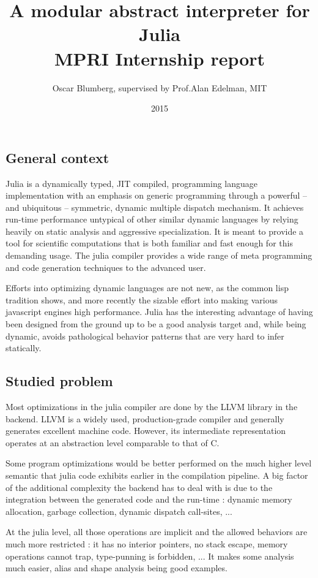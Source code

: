 \documentclass[11pt]{article}
\title{\vspace{-5ex}A modular abstract interpreter for Julia \\ MPRI Internship report}
\author{Oscar Blumberg, supervised by Prof.\@ Alan Edelman, MIT}
\date{2015}
\begin{document}
\onehalfspacing
\maketitle
\thispagestyle{empty}
\vspace{2ex}
\subsection*{General context}

Julia is a dynamically typed, JIT compiled, programming language implementation with an emphasis on generic programming through a powerful -- and ubiquitous -- symmetric, dynamic multiple dispatch mechanism. It achieves run-time performance untypical of other similar dynamic languages by relying heavily on static analysis and aggressive specialization. It is meant to provide a tool for scientific computations that is both familiar and fast enough for this demanding usage. The julia compiler provides a wide range of meta programming and code generation techniques to the advanced user.

Efforts into optimizing dynamic languages are not new, as the common lisp tradition shows, and more recently the sizable effort into making various javascript engines high performance. Julia has the interesting advantage of having been designed from the ground up to be a good analysis target and, while being dynamic, avoids pathological behavior patterns that are very hard to infer statically.

\subsection*{Studied problem}

Most optimizations in the julia compiler are done by the LLVM library in the backend. LLVM is a widely used, production-grade compiler and generally generates excellent machine code. However, its intermediate representation operates at an abstraction level comparable to that of C.

Some program optimizations would be better performed on the much higher level semantic that julia code exhibits earlier in the compilation pipeline. A big factor of the additional complexity the backend has to deal with is due to the integration between the generated code and the run-time : dynamic memory allocation, garbage collection, dynamic dispatch call-sites, ...

At the julia level, all those operations are implicit and the allowed behaviors are much more restricted : it has no interior pointers, no stack escape, memory operations cannot trap, type-punning is forbidden, ... It makes some analysis much easier, alias and shape analysis being good examples.
\end{document}
